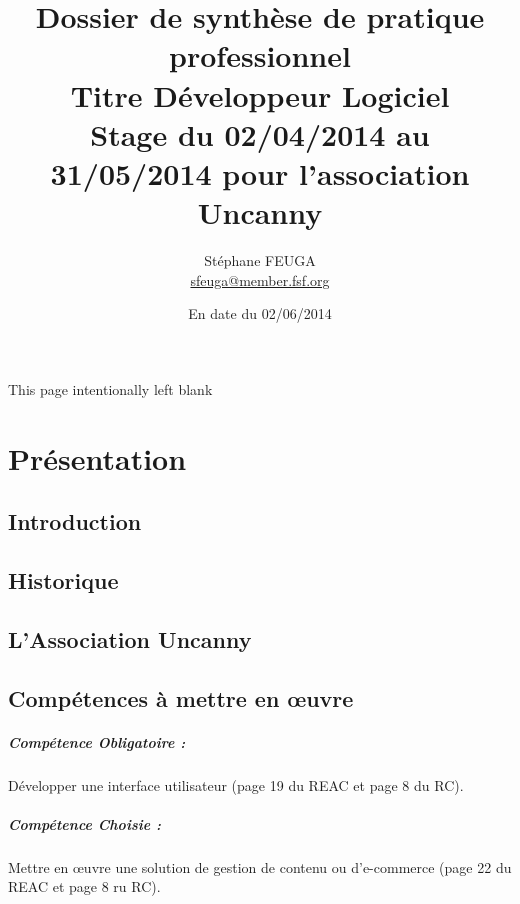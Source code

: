 \documentclass[11pt,a4paper]{report}
\author{Stéphane FEUGA\\{\small \href{mailto:sfeuga@member.fsf.org}{sfeuga@member.fsf.org}}}
\title{{\Huge Dossier de synthèse de pratique professionnel\\
Titre Développeur Logiciel}\\
{\normalsize Stage du 02/04/2014 au 31/05/2014 pour l'association Uncanny}}
\date {En date du 02/06/2014}
\begin{document}
\maketitle

\begin{center}
This page intentionally left blank
\thispagestyle{empty}
\end{center}

\tableofcontents

\chapter{Présentation}
	\section{Introduction}
		\paragraph*{}
	\section{Historique}
		\paragraph*{}
	\section{L'Association Uncanny}
		\paragraph*{}
	\section{Compétences à mettre en œuvre}
		\paragraph*{\indent Compétence Obligatoire :} Développer une interface utilisateur (page 19 du REAC et page 8 du RC).
		\paragraph*{\indent Compétence Choisie :} Mettre en œuvre une solution de gestion de contenu ou d’e-commerce (page 22 du REAC et page 8 ru RC).
\end{document}
